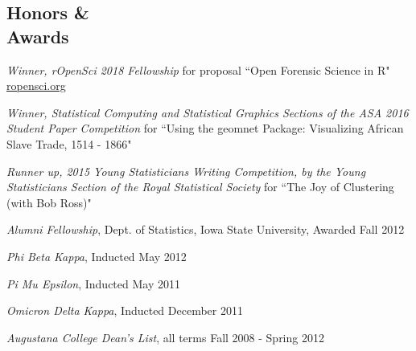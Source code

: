 \documentclass[margin,line]{res}
\begin{document}
\begin{resume}
\section{\sc Honors \& \\Awards} 
\begin{description}[itemindent = -2.75em]
\setlength\itemsep{-1em}
\item \textit{Winner, rOpenSci 2018 Fellowship} for proposal ``Open Forensic Science in R" \url{ropensci.org}\\
\item \textit{Winner, Statistical Computing and Statistical Graphics Sections of the ASA 2016 Student Paper Competition} for ``Using the geomnet Package: Visualizing African Slave Trade, 1514 - 
1866"\\
\item \textit{Runner up, 2015 Young Statisticians Writing Competition, by the Young Statisticians Section of the Royal Statistical Society} for ``The Joy of Clustering (with Bob Ross)"\\
\item \textit{Alumni Fellowship}, Dept. of Statistics, Iowa State University, Awarded Fall 2012\\
\item \textit{Phi Beta Kappa}, Inducted May 2012\\
\item \textit{Pi Mu Epsilon}, Inducted May 2011\\
\item \textit{Omicron Delta Kappa}, Inducted December 2011\\
\item \textit{Augustana College Dean's List}, all terms Fall 2008 - Spring 2012\\
\end{description}

\vspace{-.3cm}





\end{resume}
\end{document}
